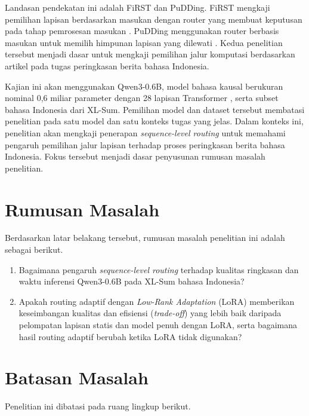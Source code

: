 Landasan pendekatan ini adalah FiRST dan PuDDing. FiRST mengkaji pemilihan lapisan berdasarkan masukan dengan router yang membuat keputusan pada tahap pemrosesan masukan \citep{jain2025first}. PuDDing menggunakan router berbasis masukan untuk memilih himpunan lapisan yang dilewati \citep{wee2025pudding}. Kedua penelitian tersebut menjadi dasar untuk mengkaji pemilihan jalur komputasi berdasarkan artikel pada tugas peringkasan berita bahasa Indonesia.

Kajian ini akan menggunakan Qwen3-0.6B, model bahasa kausal berukuran nominal 0,6 miliar parameter dengan 28 lapisan Transformer \citep{qwen2025modelcard}, serta subset bahasa Indonesia dari XL-Sum. Pemilihan model dan dataset tersebut membatasi penelitian pada satu model dan satu konteks tugas yang jelas. Dalam konteks ini, penelitian akan mengkaji penerapan \textit{sequence-level routing} untuk memahami pengaruh pemilihan jalur lapisan terhadap proses peringkasan berita bahasa Indonesia. Fokus tersebut menjadi dasar penyusunan rumusan masalah penelitian.

\section{Rumusan Masalah}

Berdasarkan latar belakang tersebut, rumusan masalah penelitian ini adalah sebagai berikut.

\begin{enumerate}
  \item Bagaimana pengaruh \textit{sequence-level routing} terhadap kualitas ringkasan dan waktu inferensi Qwen3-0.6B pada XL-Sum bahasa Indonesia?
  \item Apakah routing adaptif dengan \textit{Low-Rank Adaptation} (LoRA) memberikan keseimbangan kualitas dan efisiensi (\textit{trade-off}) yang lebih baik daripada pelompatan lapisan statis dan model penuh dengan LoRA, serta bagaimana hasil routing adaptif berubah ketika LoRA tidak digunakan?
\end{enumerate}

\section{Batasan Masalah}

Penelitian ini dibatasi pada ruang lingkup berikut.

